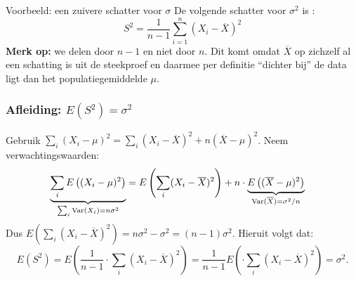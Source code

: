     \begin{frame}{Voorbeeld: een zuivere schatter voor $\sigma$}
        De volgende schatter voor $\sigma^2$ is :
        \[
            S^2 = \frac{1}{n-1}\sum_{i=1}^n (X_i - \overline{X})^2
        \]
        \vfill
        \textbf{Merk op:} we delen door $n-1$ en niet door $n$. 
        Dit komt omdat $\overline{X}$ op zichzelf al een schatting is uit de steekproef en daarmee per definitie \enquote{dichter bij}
        de data ligt dan het populatiegemiddelde $\mu$.
    \end{frame}

    \begin{frame}\frametitle{Afleiding: $E(S^2) = \sigma^2$}
        Gebruik $\sum_{i}(X_i - \mu)^2 = \sum_i (X_i - \overline{X})^2 + n(\overline{X} - \mu)^2$.\pause
        \vfill
        Neem verwachtingswaarden:
        \begin{align*}
            \underbrace{\sum_i E\left((X_i - \mu)^2\right)}_{\sum_i \text{Var}(X_i)=n\sigma^2} &= E\left(\sum_i (X_i - \overline{X})^2\right) + n \cdot \underbrace{E\left((\overline{X} - \mu)^2\right)}_{\text{Var}(\overline{X}) = \sigma^2/n}
        \end{align*}\pause
        Dus $E\left(\sum_i (X_i - \overline{X})^2\right) = n\sigma^2 - \sigma^2 = (n-1)\sigma^2$.\pause
        \vfill
        Hieruit volgt dat:
        \[
            E(S^2) = E\left(\frac{1}{n-1}\cdot \sum_i (X_i - \overline{X})^2\right)=\frac{1}{n-1}E\left(\cdot \sum_i (X_i - \overline{X})^2\right)=\sigma^2.
        \]
    \end{frame}



